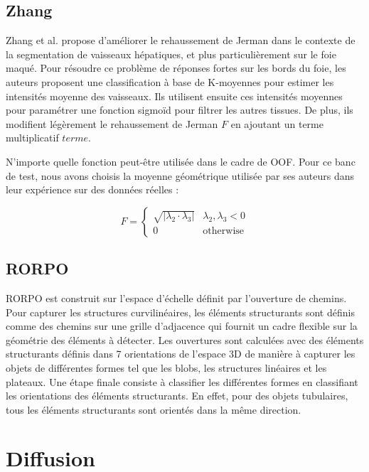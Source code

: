 \subsection{Zhang}

Zhang et al. propose d'améliorer le rehaussement de Jerman dans le contexte de la segmentation de vaisseaux hépatiques, et plus particulièrement sur le foie maqué. Pour résoudre ce problème de réponses fortes sur les bords du foie, les auteurs proposent une classification à base de K-moyennes pour estimer les intensités moyenne des vaisseaux. Ils utilisent ensuite ces intensités moyennes pour paramétrer une fonction sigmoïd pour filtrer les autres tissues. De plus, ils modifient légèrement le rehaussement de Jerman $F$ en ajoutant un terme multiplicatif $terme$.

N'importe quelle fonction peut-être utilisée dans le cadre de OOF. Pour ce banc de test, nous avons choisis la moyenne géométrique utilisée par ses auteurs dans leur expérience sur des données réelles :

\begin{equation}
\nonumber
    F =
    \left\{
    \begin{array}{lr}
    
    \sqrt{|\lambda_2 \cdot \lambda_3|}   & \lambda_2, \lambda_3 < 0 \\
    0     & \textrm{otherwise}
    \end{array}
    \right.
\end{equation}

\subsection{RORPO}

RORPO \cite{Merveille2018_curvilinear} est construit sur l'espace d'échelle définit par l'ouverture de chemins. Pour capturer les structures curvilinéaires, les éléments structurants sont définis comme des chemins sur une grille d'adjacence qui fournit un cadre flexible sur la géométrie des éléments à détecter. Les ouvertures sont calculées avec des éléments structurants définis dans 7 orientations de l'espace 3D de manière à capturer les objets de différentes formes tel que les blobs, les structures linéaires et les plateaux. Une étape finale consiste à classifier les différentes formes en classifiant les orientations des éléments structurants. En effet, pour des objets tubulaires, tous les éléments structurants sont orientés dans la même direction.


\section{Diffusion}
\label{sec:EA:rehaussement:diffusion}


